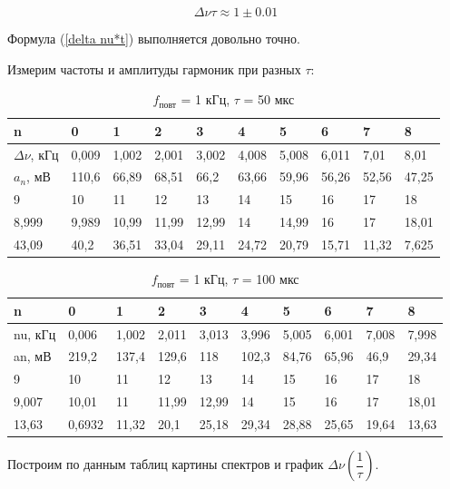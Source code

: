 \documentclass[a4paper, 12pt]{article}
\begin{document}
\[\Delta \nu \tau \approx 1 \pm 0.01\]

Формула (\ref{delta nu*t}) выполняется довольно точно.

Измерим частоты и амплитуды гармоник при разных $\tau$:

\newpage

\begin{table}[h!]
\caption{$f_\text{повт}$ = 1 кГц, $\tau$ = 50 мкс}
\begin{tabular}{|l|l|l|l|l|l|l|l|l|l|}
\hline
n       & 0     & 1     & 2     & 3     & 4     & 5     & 6     & 7     & 8     \\ \hline
$\Delta \nu$, кГц & 0,009 & 1,002 & 2,001 & 3,002 & 4,008 & 5,008 & 6,011 & 7,01  & 8,01  \\ \hline
$a_n$, мВ  & 110,6 & 66,89 & 68,51 & 66,2  & 63,66 & 59,96 & 56,26 & 52,56 & 47,25 \\ \hline
\hline
9     & 10    & 11    & 12    & 13    & 14    & 15    & 16    & 17    & 18    \\ \hline
8,999 & 9,989 & 10,99 & 11,99 & 12,99 & 14    & 14,99 & 16    & 17    & 18,01 \\ \hline
43,09 & 40,2  & 36,51 & 33,04 & 29,11 & 24,72 & 20,79 & 15,71 & 11,32 & 7,625 \\ \hline
\end{tabular}
\end{table}

\begin{table}[h!]
\caption{$f_\text{повт}$ = 1 кГц, $\tau$ = 100 мкс}
\begin{tabular}{|l|l|l|l|l|l|l|l|l|l|}
\hline
n       & 0     & 1     & 2     & 3     & 4     & 5     & 6     & 7     & 8     \\ \hline
nu, кГц & 0,006 & 1,002 & 2,011 & 3,013 & 3,996 & 5,005 & 6,001 & 7,008 & 7,998 \\ \hline
an, мВ  & 219,2 & 137,4 & 129,6 & 118   & 102,3 & 84,76 & 65,96 & 46,9  & 29,34 \\ \hline
\hline
9     & 10     & 11    & 12    & 13    & 14    & 15    & 16    & 17    & 18    \\ \hline
9,007 & 10,01  & 11    & 11,99 & 12,99 & 14    & 15    & 16    & 17    & 18,01 \\ \hline
13,63 & 0,6932 & 11,32 & 20,1  & 25,18 & 29,34 & 28,88 & 25,65 & 19,64 & 13,63 \\ \hline
\end{tabular}
\end{table}

Построим по данным таблиц картины спектров и график $\Delta \nu \left(\dfrac{1}{\tau}\right)$.
\end{document}
